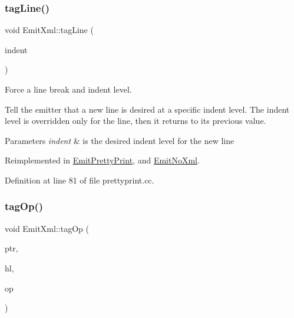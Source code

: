 \subsubsection{\texorpdfstring{tagLine()}{tagLine()}\hspace{0.1cm}{\footnotesize\ttfamily [2/2]}}
{\footnotesize\ttfamily void Emit\+Xml\+::tag\+Line (\begin{DoxyParamCaption}\item[{int4}]{indent }\end{DoxyParamCaption})\hspace{0.3cm}{\ttfamily [virtual]}}



Force a line break and indent level. 

Tell the emitter that a new line is desired at a specific indent level. The indent level is overridden only for the line, then it returns to its previous value. 
\begin{DoxyParams}{Parameters}
{\em indent} & is the desired indent level for the new line \\
\hline
\end{DoxyParams}


Reimplemented in \mbox{\hyperlink{class_emit_pretty_print_a9e14af0674eafd65ffdee52380944347}{Emit\+Pretty\+Print}}, and \mbox{\hyperlink{class_emit_no_xml_a3b6ea3b42908f2d7e6e18ece69d24273}{Emit\+No\+Xml}}.



Definition at line 81 of file prettyprint.\+cc.

\mbox{\label{class_emit_xml_a66f5a32fa62561f08d29e725d20c0596}} 
\subsubsection{\texorpdfstring{tagOp()}{tagOp()}}
{\footnotesize\ttfamily void Emit\+Xml\+::tag\+Op (\begin{DoxyParamCaption}\item[{const char $\ast$}]{ptr,  }\item[{\mbox{\hyperlink{class_emit_xml_a7c3577436da429c3c75f4b82cac6864f}{syntax\+\_\+highlight}}}]{hl,  }\item[{const \mbox{\hyperlink{class_pcode_op}{Pcode\+Op}} $\ast$}]{op }\end{DoxyParamCaption})\hspace{0.3cm}{\ttfamily [virtual]}}



